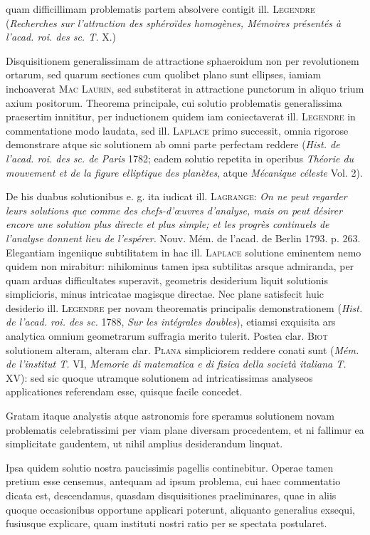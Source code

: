 quam difficillimam problematis partem absolvere contigit ill. \textsc{Legendre} (\textit{Recherches sur l’attraction des sphéroïdes homogènes, Mémoires présentés à l’acad. roi. des sc. T.} X.)

Disquisitionem generalissimam de attractione sphaeroidum non per revolutionem ortarum, sed quarum sectiones cum quolibet plano sunt ellipses, iamiam inchoaverat \textsc{Mac Laurin}, sed substiterat in attractione punctorum in aliquo trium axium positorum. Theorema principale, cui solutio problematis generalissima praesertim innititur, per inductionem quidem iam coniectaverat ill. \textsc{Legendre} in commentatione modo laudata, sed ill. \textsc{Laplace} primo successit, omnia rigorose demonstrare atque sic solutionem ab omni parte perfectam reddere (\textit{Hist. de l’acad. roi. des sc. de Paris} 1782; eadem solutio repetita in operibus \textit{Théorie du mouvement et de la figure elliptique des planètes}, atque \textit{Mécanique céleste} Vol. 2).

\expandafter\def\csname HistoricalNoteText008\endcsname{De his duabus solutionibus e. g. ita iudicat ill. \textsc{Lagrange}: \textit{On ne peut regarder leurs solutions que comme des chefs-d’œuvres d’analyse, mais on peut désirer encore une solution plus directe et plus simple; et les progrès continuels de l’analyse donnent lieu de l’espérer.} Nouv. Mém. de l’acad. de Berlin 1793. p. 263.}
Elegantiam ingeniique subtilitatem in hac ill. \textsc{Laplace} solutione eminentem nemo quidem non mirabitur: nihilominus tamen ipsa subtilitas arsque admiranda, per quam arduas difficultates superavit, geometris desiderium liquit solutionis simplicioris, minus intricatae magisque directae. Nec plane satisfecit huic desiderio ill. \textsc{Legendre} per novam theorematis principalis demonstrationem (\textit{Hist. de l’acad. roi. des sc.} 1788, \textit{Sur les intégrales doubles}), etiamsi exquisita ars analytica omnium geometrarum suffragia merito tulerit. Postea clar. \textsc{Biot} solutionem alteram, alteram clar. \textsc{Plana} simpliciorem reddere conati sunt (\textit{Mém. de l’institut T.} VI, \textit{Memorie di matematica e di fisica della società italiana T.} XV): sed sic quoque utramque solutionem ad intricatissimas analyseos applicationes referendam esse, quisque facile concedet.

Gratam itaque analystis atque astronomis fore speramus solutionem novam problematis celebratissimi per viam plane diversam procedentem, et ni fallimur ea simplicitate gaudentem, ut nihil amplius desiderandum linquat.

Ipsa quidem solutio nostra paucissimis pagellis continebitur. Operae tamen pretium esse censemus, antequam ad ipsum problema, cui haec commentatio dicata est, descendamus, quasdam disquisitiones praeliminares, quae in aliis quoque occasionibus opportune applicari poterunt, aliquanto generalius exsequi, fusiusque explicare, quam instituti nostri ratio per se spectata postularet.
